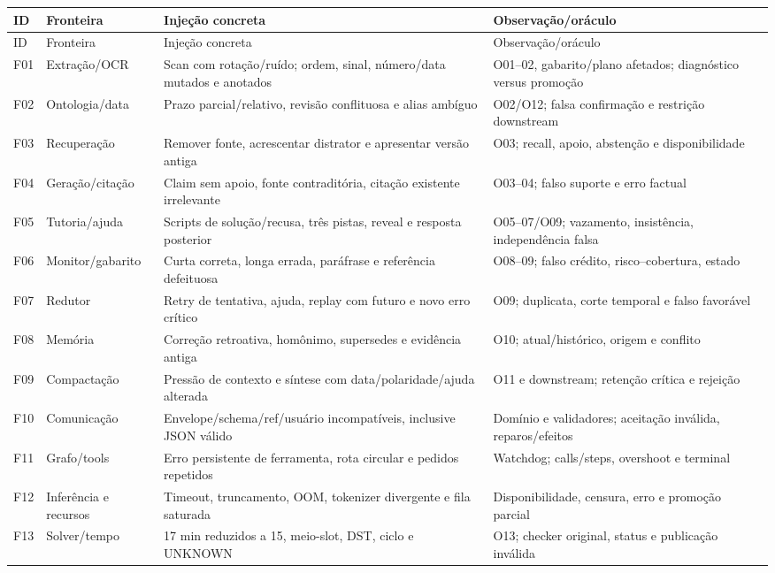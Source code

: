 \documentclass[12pt]{article}
\begin{document}
\begin{center}\small
\begin{longtable}{@{}L{0.8cm}L{3.0cm}L{6.3cm}L{4.7cm}@{}}
\toprule ID & Fronteira & Injeção concreta & Observação/oráculo \\ \midrule
\endfirsthead
\toprule ID & Fronteira & Injeção concreta & Observação/oráculo \\ \midrule
\endhead
F01 & Extração/OCR & Scan com rotação/ruído; ordem, sinal, número/data mutados e anotados & O01--02, gabarito/plano afetados; diagnóstico versus promoção \\
F02 & Ontologia/data & Prazo parcial/relativo, revisão conflituosa e alias ambíguo & O02/O12; falsa confirmação e restrição downstream \\
F03 & Recuperação & Remover fonte, acrescentar distrator e apresentar versão antiga & O03; recall, apoio, abstenção e disponibilidade \\
F04 & Geração/citação & Claim sem apoio, fonte contraditória, citação existente irrelevante & O03--04; falso suporte e erro factual \\
F05 & Tutoria/ajuda & Scripts de solução/recusa, três pistas, reveal e resposta posterior & O05--07/O09; vazamento, insistência, independência falsa \\
F06 & Monitor/gabarito & Curta correta, longa errada, paráfrase e referência defeituosa & O08--09; falso crédito, risco--cobertura, estado \\
F07 & Redutor & Retry de tentativa, ajuda, replay com futuro e novo erro crítico & O09; duplicata, corte temporal e falso favorável \\
F08 & Memória & Correção retroativa, homônimo, supersedes e evidência antiga & O10; atual/histórico, origem e conflito \\
F09 & Compactação & Pressão de contexto e síntese com data/polaridade/ajuda alterada & O11 e downstream; retenção crítica e rejeição \\
F10 & Comunicação & Envelope/schema/ref/usuário incompatíveis, inclusive JSON válido & Domínio e validadores; aceitação inválida, reparos/efeitos \\
F11 & Grafo/tools & Erro persistente de ferramenta, rota circular e pedidos repetidos & Watchdog; calls/steps, overshoot e terminal \\
F12 & Inferência e recursos & Timeout, truncamento, OOM, tokenizer divergente e fila saturada & Disponibilidade, censura, erro e promoção parcial \\
F13 & Solver/tempo & 17 min reduzidos a 15, meio-slot, DST, ciclo e UNKNOWN & O13; checker original, status e publicação inválida \\

\end{longtable}
\end{center}
\end{document}
